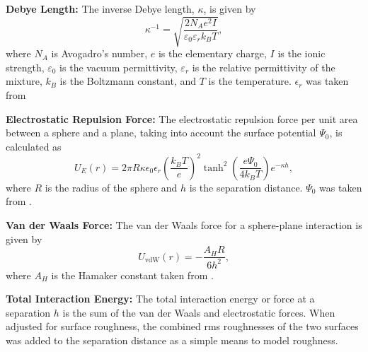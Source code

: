 \textbf{Debye Length:} The inverse Debye length, $\kappa$, is given by
    \[
    \kappa^{-1} = \sqrt{\frac{2 N_A e^2 I}{\varepsilon_0 \varepsilon_r k_B T}},
    \]
    where $N_A$ is Avogadro's number, $e$ is the elementary charge, $I$ is the ionic strength, $\varepsilon_0$ is the vacuum permittivity, $\varepsilon_r$ is the relative permittivity of the mixture, $k_B$ is the Boltzmann constant, and $T$ is the temperature. $\epsilon_r$ was taken from \cite{behrends2006dielectric}
    
\textbf{Electrostatic Repulsion Force:} The electrostatic repulsion force per unit area between a sphere and a plane, taking into account the surface potential $\Psi_0$, is calculated as
    \[
    U_E(r) = 2 \pi R \kappa \epsilon_0 \epsilon_r \left( \frac{k_B T}{e} \right)^2 \tanh^2\left(\frac{e \Psi_0}{4 k_B T}\right) e^{-\kappa h},
    \]
    where $R$ is the radius of the sphere and $h$ is the separation distance. $\Psi_0$ was taken from \cite{silica2021}.
    
\textbf{Van der Waals Force:} The van der Waals force for a sphere-plane interaction is given by
    \[
    U_{\text{vdW}}(r) = -\frac{A_H R}{6 h^2},
    \]
    where $A_H$ is the Hamaker constant taken from \cite{Bergstrom1997}.
    
\textbf{Total Interaction Energy:} The total interaction energy or force at a separation $h$ is the sum of the van der Waals and electrostatic forces. When adjusted for surface roughness, the combined rms roughnesses of the two surfaces was added to the separation distance as a simple means to model roughness.

